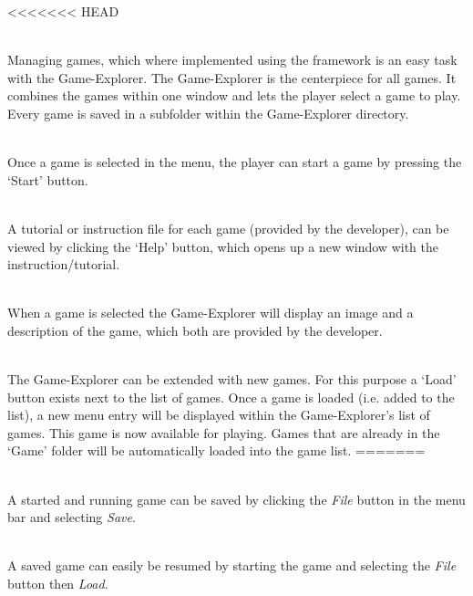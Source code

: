 \vspace{.5cm}

\begin{description}
<<<<<<< HEAD
  	\item[\textlabel{/FR090/}{FR:090}] \textbf{} \\
  	Managing games, which where implemented using the {\graphioli} framework is an easy task with the Game-Explorer. The Game-Explorer is the centerpiece for all games. It combines the games within one window and lets the player select a game to play. Every game is saved in a subfolder within the Game-Explorer directory.
 	\item[\textlabel{/FR100/}{FR:100}] \textbf{}  \\
 	Once a game is selected in the menu, the player can start a game by pressing the `Start' button.
	\item[\textlabel{/FR110/}{FR:110}] \textbf{}  \\
  	A tutorial or instruction file for each game (provided by the developer), can be viewed by clicking the `Help' button, which opens up a new window with the instruction/tutorial.
	\item[\textlabel{/FR120/}{FR:120}] \textbf{}  \\
	When a game is selected the Game-Explorer will display an image and a description of the game, which both are provided by the developer.
	\item[\textlabel{/FR130/}{FR:130}] \textbf{} \\
	The Game-Explorer can be extended with new games. For this purpose a `Load' button exists next to the list of games. Once a game is loaded (i.e. added to the list), a new menu entry will be displayed within the Game-Explorer's list of games. This game is now available for playing. Games that are already in the `Game' folder will be automatically loaded into the game list.
=======
  	\item[\textlabel{/FR130/}{FR:G010}] \textbf{}  \\
  	A started and running game can be saved by clicking the \emph{File} button in the menu bar and selecting \emph{Save}.
 	\item[\textlabel{/FR140/}{FR:G020}] \textbf{}  \\
 	A saved game can easily be resumed by starting the game and selecting the \emph{File} button then \emph{Load}.

\end{description}
